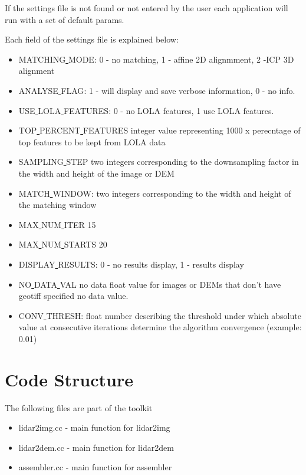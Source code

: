 \documentclass[12pt]{article}
\begin{document}
If the settings file is not found or not entered by the user each application will run with a set of default params.

Each field of the settings file is explained below:
\begin{itemize}
\item{MATCHING\underline{ }MODE}: 0 - no matching, 1 - affine 2D alignmment, 2 -ICP 3D alignment\\
\item{ANALYSE\underline{ }FLAG}:  1 - will display and save verbose information, 0 - no info.\\
\item{USE\underline{ }LOLA\underline{ }FEATURES}: 0 - no LOLA features, 1 use LOLA features.\\ 
\item{TOP\underline{ }PERCENT\underline{ }FEATURES} integer value representing 1000 x perecntage of top features to be kept from LOLA data\\
\item{SAMPLING\underline{ }STEP} two integers corresponding to the downsampling factor in the width and height of the image or DEM\\
\item{MATCH\underline{ }WINDOW}: two integers corresponding to the width and height of the matching window\\
\item{MAX\underline{ }NUM\underline{ }ITER} 15\\
\item{MAX\underline{ }NUM\underline{ }STARTS} 20\\
\item{DISPLAY\underline{ }RESULTS}: 0 - no results display, 1 - results display\\
\item{NO\underline{ }DATA\underline{ }VAL} no data float value for images or DEMs that don't have geotiff specified no data value.\\
\item{CONV\underline{ }THRESH}: float number describing the threshold under which absolute value at consecutive iterations determine 
                                the algorithm convergence (example: 0.01)\\
\end{itemize}


\section{Code Structure}
The following files are part of the toolkit
\begin{itemize}
\item{lidar2img.cc} - main function for lidar2img
\item{lidar2dem.cc} - main function for lidar2dem 
\item{assembler.cc} - main function for assembler
\end{itemize}
\end{document}
